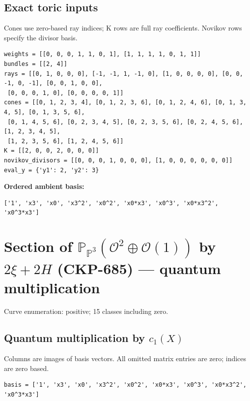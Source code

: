 \documentclass[10pt,a4paper]{article}
\begin{document}
\subsection*{Exact toric inputs}
Cones use zero-based ray indices; K rows are full ray coefficients. Novikov rows specify the divisor basis.

\begin{lstlisting}
weights = [[0, 0, 0, 1, 1, 0, 1], [1, 1, 1, 1, 0, 1, 1]]
bundles = [[2, 4]]
rays = [[0, 1, 0, 0, 0], [-1, -1, 1, -1, 0], [1, 0, 0, 0, 0], [0, 0, -1, 0, -1], [0, 0, 1, 0, 0],
 [0, 0, 0, 1, 0], [0, 0, 0, 0, 1]]
cones = [[0, 1, 2, 3, 4], [0, 1, 2, 3, 6], [0, 1, 2, 4, 6], [0, 1, 3, 4, 5], [0, 1, 3, 5, 6],
 [0, 1, 4, 5, 6], [0, 2, 3, 4, 5], [0, 2, 3, 5, 6], [0, 2, 4, 5, 6], [1, 2, 3, 4, 5],
 [1, 2, 3, 5, 6], [1, 2, 4, 5, 6]]
K = [[2, 0, 0, 2, 0, 0, 0]]
novikov_divisors = [[0, 0, 0, 1, 0, 0, 0], [1, 0, 0, 0, 0, 0, 0]]
eval_y = {'y1': 2, 'y2': 3}
\end{lstlisting}

\textbf{Ordered ambient basis:}
\begin{lstlisting}
['1', 'x3', 'x0', 'x3^2', 'x0^2', 'x0*x3', 'x0^3', 'x0*x3^2', 'x0^3*x3']
\end{lstlisting}

\clearpage\section*{Section of $\mathbb P_{\mathbb P^{3}}(\mathcal O^{2}\oplus \mathcal O(1))$ by $2\xi +2H$ (CKP-685) --- quantum multiplication}

Curve enumeration: positive; 15 classes including zero.
\subsection*{Quantum multiplication by $c_1(X)$}
Columns are images of basis vectors. All omitted matrix entries are zero; indices are zero based.

\begin{lstlisting}
basis = ['1', 'x3', 'x0', 'x3^2', 'x0^2', 'x0*x3', 'x0^3', 'x0*x3^2', 'x0^3*x3']
\end{lstlisting}
\end{document}
